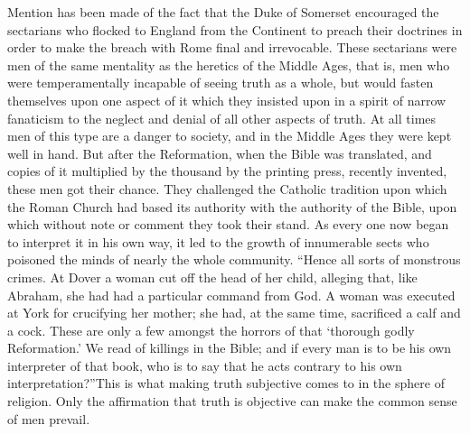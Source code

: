 \documentclass{book}
\begin{document}
Mention has been made of the fact that the Duke of Somerset encouraged the sectarians who flocked to England from the Continent to preach their doctrines in order to make the breach with Rome final and irrevocable. These sectarians were men of the same mentality as the heretics of the Middle Ages, that is, men who were temperamentally incapable of seeing truth as a whole, but would fasten themselves upon one aspect of it which they insisted upon in a spirit of narrow fanaticism to the neglect and denial of all other aspects of truth. At all times men of this type are a danger to society, and in the Middle Ages they were kept well in hand. But after the Reformation, when the Bible was translated, and copies of it multiplied by the thousand by the printing press, recently invented, these men got their chance. They challenged the Catholic tradition upon which the Roman Church had based its authority with the authority of the Bible, upon which without note or comment they took their stand. As every one now began to interpret it in his own way, it led to the growth of innumerable sects who poisoned the minds of nearly the whole community. “Hence all sorts of monstrous crimes. At Dover a woman cut off the head of her child, alleging that, like Abraham, she had had a particular command from God. A woman was executed at York for crucifying her mother; she had, at the same time, sacrificed a calf and a cock. These are only a few amongst the horrors of that ‘thorough godly Reformation.’ We read of killings in the Bible; and if every man is to be his own interpreter of that book, who is to say that he acts contrary to his own interpretation?”\footnotemark[5] This is what making truth subjective comes to in the sphere of religion. Only the affirmation that truth is objective can make the common sense of men prevail.
\end{document}
